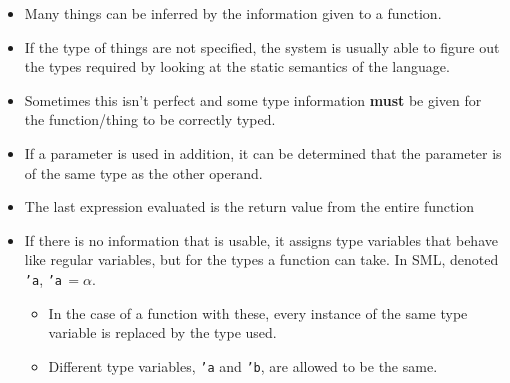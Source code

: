 \begin{itemize}[noitemsep]
\item Many things can be inferred by the information given to a function.
\item If the type of things are not specified, the system is usually able to figure out the types required by looking at the static semantics of the language.
\item Sometimes this isn't perfect and some type information \textbf{must} be given for the function/thing to be correctly typed.
\item If a parameter is used in addition, it can be determined that the parameter is of the same type as the other operand.
\item The last expression evaluated is the return value from the entire function
\item If there is no information that is usable, it assigns type variables that behave like regular variables, but for the types a function can take. In SML, denoted \texttt{'a}, \texttt{'a}$\,=\alpha$.
  \begin{itemize}[noitemsep]
  \item In the case of a function with these, every instance of the same type variable is replaced by the type used.
  \item Different type variables, \texttt{'a} and \texttt{'b}, are allowed to be the same.
  \end{itemize}
\end{itemize}

